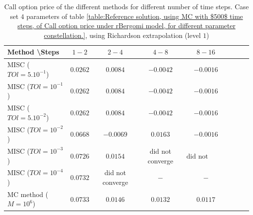 \documentclass[11pt]{article}
\begin{document}
\begin{table}[h!]
\centering
\begin{tabular}{l*{6}{c}r}
Method \textbackslash  Steps    &$1-2$         & $2-4$ & $4-8$ & $8-16$\\
\hline
MISC ($TOl=5.10^{-1}$)& $0.0262$  & $0.0084$ & $-0.0042$ & $-0.0016$ \\
MISC ($TOl=10^{-1}$)  &$0.0262$  & $0.0084$ & $-0.0042$ & $-0.0016$  \\
MISC ($TOl=5.10^{-2}$)  &$0.0262$  & $0.0084$ & $-0.0042$ & $-0.0016$  \\
MISC ($TOl=10^{-2}$)  & $0.0668$  & $-0.0069$ & $0.0163$ & $-0.0016$  \\
MISC ($TOl=10^{-3}$)  & $0.0726$ & $0.0154$ & did not converge & $\text{did not converge}$ \\
MISC ($TOl=10^{-4}$)  & $0.0732$ &did not converge & $-$ & $-$  \\
\hline
MC method ($M=10^6$)  &$0.0733$ & $0.0146$ & $0.0132$ & $0.0117$ \\
\hline
\end{tabular}
\caption{Call option price of the different methods for different number of time steps. Case set $4$ parameters of table \ref{table:Reference solution, using MC with $500$ time steps, of Call option price under rBergomi model, for different parameter constellation.}, using Richardson extrapolation (level $1$)}
\label{table:  Call option price of the different methods for different number of time steps. Case set $4$ parameter, using Richardson extrapolation (level $1$)}
\end{table}
\end{document}
